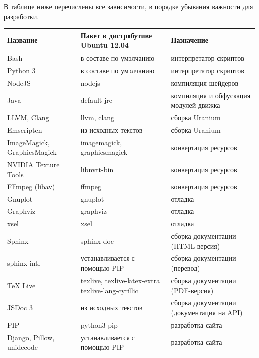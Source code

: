 \documentclass[a4paper,12pt,oneside]{sphinxmanual}
\begin{document}
В таблице ниже перечислены все зависимости, в порядке убывания важности для
разработки.

\begin{tabulary}{\linewidth}{|L|L|L|}
\hline
\textsf{\relax 
Название
} & \textsf{\relax 
Пакет в дистрибутиве Ubuntu
12.04
} & \textsf{\relax 
Назначение
}\\
\hline
Bash
 & 
в составе по умолчанию
 & 
интерпретатор скриптов
\\

Python 3
 & 
в составе по умолчанию
 & 
интерпретатор скриптов
\\

NodeJS
 & 
nodejs
 & 
компиляция шейдеров
\\

Java
 & 
default-jre
 & 
компиляция и обфускация
модулей движка
\\

LLVM, Clang
 & 
llvm, clang
 & 
сборка Uranium
\\

Emscripten
 & 
из исходных текстов
 & 
сборка Uranium
\\

ImageMagick, GraphicsMagick
 & 
imagemagick, graphicsmagick
 & 
конвертация ресурсов
\\

NVIDIA Texture Tools
 & 
libnvtt-bin
 & 
конвертация ресурсов
\\

FFmpeg (libav)
 & 
ffmpeg
 & 
конвертация ресурсов
\\

Gnuplot
 & 
gnuplot
 & 
отладка
\\

Graphviz
 & 
graphviz
 & 
отладка
\\

xsel
 & 
xsel
 & 
отладка
\\

Sphinx
 & 
sphinx-doc
 & 
сборка документации
(HTML-версия)
\\

sphinx-intl
 & 
устанавливается с помощью PIP
 & 
сборка документации
(перевод)
\\

TeX Live
 & 
texlive, texlive-latex-extra
texlive-lang-cyrillic
 & 
сборка документации
(PDF-версия)
\\

JSDoc 3
 & 
из исходных текстов
 & 
сборка документации
(документация на API)
\\

PIP
 & 
python3-pip
 & 
разработка сайта
\\

Django, Pillow, unidecode
 & 
устанавливается с помощью PIP
 & 
разработка сайта
\\
\hline\end{tabulary}
\end{document}
